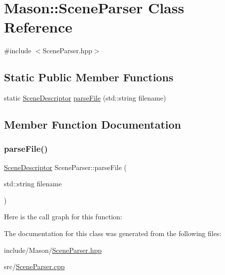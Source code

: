 \hypertarget{class_mason_1_1_scene_parser}{}\section{Mason\+:\+:Scene\+Parser Class Reference}
\label{class_mason_1_1_scene_parser}


{\ttfamily \#include $<$Scene\+Parser.\+hpp$>$}

\subsection*{Static Public Member Functions}
\begin{DoxyCompactItemize}
\item 
static \hyperlink{class_mason_1_1_scene_descriptor}{Scene\+Descriptor} \hyperlink{class_mason_1_1_scene_parser_ade3727eacb10881f5db54e649d649354}{parse\+File} (std\+::string filename)
\end{DoxyCompactItemize}


\subsection{Member Function Documentation}
\hypertarget{class_mason_1_1_scene_parser_ade3727eacb10881f5db54e649d649354}{}\label{class_mason_1_1_scene_parser_ade3727eacb10881f5db54e649d649354} 
\subsubsection{\texorpdfstring{parse\+File()}{parseFile()}}
{\footnotesize\ttfamily \hyperlink{class_mason_1_1_scene_descriptor}{Scene\+Descriptor} Scene\+Parser\+::parse\+File (\begin{DoxyParamCaption}\item[{std\+::string}]{filename }\end{DoxyParamCaption})\hspace{0.3cm}{\ttfamily [static]}}

Here is the call graph for this function\+:


The documentation for this class was generated from the following files\+:\begin{DoxyCompactItemize}
\item 
include/\+Mason/\hyperlink{_scene_parser_8hpp}{Scene\+Parser.\+hpp}\item 
src/\hyperlink{_scene_parser_8cpp}{Scene\+Parser.\+cpp}\end{DoxyCompactItemize}
